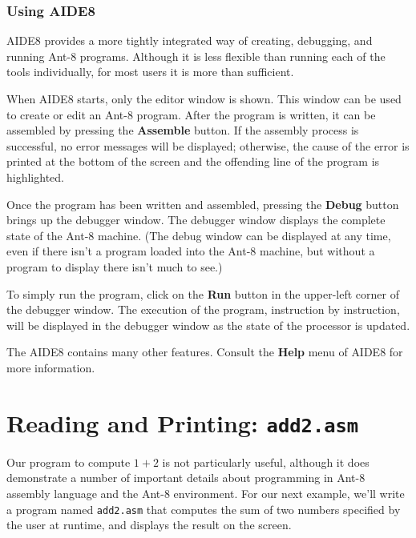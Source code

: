 \subsubsection{Using {\sc AIDE8}}

{\sc AIDE8} provides a more tightly integrated way of creating,
debugging, and running {\sc Ant-8} programs.  Although it is less
flexible than running each of the tools individually, for most users
it is more than sufficient.

When {\sc AIDE8} starts, only the editor window is shown.  This window
can be used to create or edit an {\sc Ant-8} program.  After the program
is written, it can be assembled by pressing the {\bf Assemble} button. 
If the assembly process is successful, no error messages will be
displayed; otherwise, the cause of the error is printed at the bottom
of the screen and the offending line of the program is highlighted.

Once the program has been written and assembled, pressing the {\bf
Debug} button brings up the debugger window.  The debugger window
displays the complete state of the {\sc Ant-8} machine.  (The debug
window can be displayed at any time, even if there isn't a program
loaded into the {\sc Ant-8} machine, but without a program to display
there isn't much to see.)

To simply run the program, click on the {\bf Run} button in the
upper-left corner of the debugger window.  The execution of the
program, instruction by instruction, will be displayed in the debugger
window as the state of the processor is updated.

The {\sc AIDE8} contains many other features.  Consult the {\bf Help}
menu of {\sc AIDE8} for more information.


\section{Reading and Printing: {\tt add2.asm}}
\label{add2-sec}

Our program to compute $1 + 2$ is not particularly useful, although
it does demonstrate a number of important details about programming
in {\sc Ant-8} assembly language and the {\sc Ant-8} environment.  For our next
example, we'll write a program named {\tt add2.asm} that computes
the sum of two numbers specified by the user at runtime,
and displays the result on the screen.

